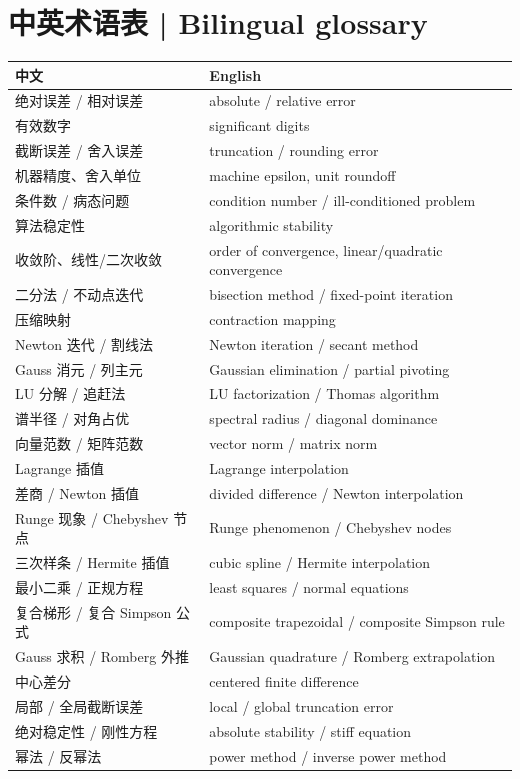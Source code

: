 \documentclass[UTF8,11pt,a4paper]{ctexart}
\begin{document}
\section*{中英术语表 | Bilingual glossary}
\begin{center}\footnotesize
\begin{tabular}{p{}p{}}
\hline
\textbf{中文} & \textbf{English}\\
\hline
绝对误差 / 相对误差 & absolute / relative error\\
有效数字 & significant digits\\
截断误差 / 舍入误差 & truncation / rounding error\\
机器精度、舍入单位 & machine epsilon, unit roundoff\\
条件数 / 病态问题 & condition number / ill-conditioned problem\\
算法稳定性 & algorithmic stability\\
收敛阶、线性/二次收敛 & order of convergence, linear/quadratic convergence\\
二分法 / 不动点迭代 & bisection method / fixed-point iteration\\
压缩映射 & contraction mapping\\
Newton 迭代 / 割线法 & Newton iteration / secant method\\
Gauss 消元 / 列主元 & Gaussian elimination / partial pivoting\\
LU 分解 / 追赶法 & LU factorization / Thomas algorithm\\
谱半径 / 对角占优 & spectral radius / diagonal dominance\\
向量范数 / 矩阵范数 & vector norm / matrix norm\\
Lagrange 插值 & Lagrange interpolation\\
差商 / Newton 插值 & divided difference / Newton interpolation\\
Runge 现象 / Chebyshev 节点 & Runge phenomenon / Chebyshev nodes\\
三次样条 / Hermite 插值 & cubic spline / Hermite interpolation\\
最小二乘 / 正规方程 & least squares / normal equations\\
复合梯形 / 复合 Simpson 公式 & composite trapezoidal / composite Simpson rule\\
Gauss 求积 / Romberg 外推 & Gaussian quadrature / Romberg extrapolation\\
中心差分 & centered finite difference\\
局部 / 全局截断误差 & local / global truncation error\\
绝对稳定性 / 刚性方程 & absolute stability / stiff equation\\
幂法 / 反幂法 & power method / inverse power method\\
\hline
\end{tabular}
\end{center}
\end{document}
